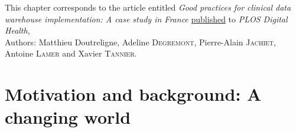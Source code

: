 \documentclass[french,12pt,twoside,a4paper]{book}
\begin{document}
\vfill
\begin{flushright}
  \begin{minipage}{15cm}
    {\small{This chapter corresponds to the article entitled \textit{Good practices for clinical data warehouse
          implementation: A case study in France}
        \underline{published} to \textit{PLOS Digital Health},}}\\
    {\small\hfill{} Authors: Matthieu Doutreligne, Adeline \textsc{Degremont}, Pierre-Alain
    \textsc{Jachiet}, Antoine \textsc{Lamer} and Xavier \textsc{Tannier}.}
  \end{minipage}
\end{flushright}


\clearpage
\minitoc

\section{Motivation and background: A changing world}\label{sec:cdw:motivation}
\end{document}
